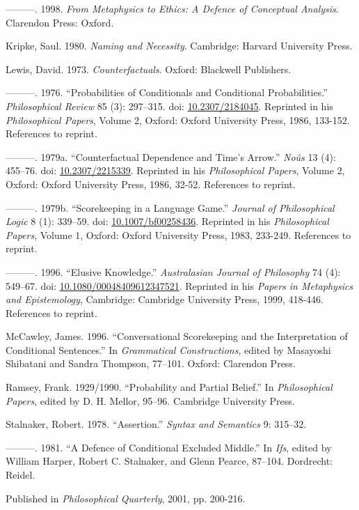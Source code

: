 \documentclass[
  10pt,
  letterpaper,
  DIV=11,
  numbers=noendperiod,
  twoside]{scrartcl}
\newlength{\cslhangindent}
\newenvironment{CSLReferences}[2] %
 {\begin{list}{}{%
  \setlength{\itemindent}{0pt}
  \setlength{\leftmargin}{0pt}
  \setlength{\parsep}{0pt}
  \ifodd #1
   \setlength{\leftmargin}{\cslhangindent}
   \setlength{\itemindent}{-1\cslhangindent}
  \fi
  \setlength{\itemsep}{#2\baselineskip}}}
 {\end{list}}
\begin{document}
\begin{CSLReferences}{1}{0}
---------. 1998. \emph{From Metaphysics to Ethics: A Defence of
Conceptual Analysis}. Clarendon Press: Oxford.

Kripke, Saul. 1980. \emph{Naming and Necessity}. Cambridge: Harvard
University Press.

Lewis, David. 1973. \emph{Counterfactuals}. Oxford: Blackwell
Publishers.

---------. 1976. {``Probabilities of Conditionals and Conditional
Probabilities.''} \emph{Philosophical Review} 85 (3): 297--315. doi:
\href{https://doi.org/10.2307/2184045}{10.2307/2184045}. Reprinted in
his \emph{Philosophical Papers}, Volume 2, Oxford: Oxford University
Press, 1986, 133-152. References to reprint.

---------. 1979a. {``Counterfactual Dependence and Time's Arrow.''}
\emph{No{û}s} 13 (4): 455--76. doi:
\href{https://doi.org/10.2307/2215339}{10.2307/2215339}. Reprinted in
his \emph{Philosophical Papers}, Volume 2, Oxford: Oxford University
Press, 1986, 32-52. References to reprint.

---------. 1979b. {``Scorekeeping in a Language Game.''} \emph{Journal
of Philosophical Logic} 8 (1): 339--59. doi:
\href{https://doi.org/10.1007/bf00258436}{10.1007/bf00258436}. Reprinted
in his \emph{Philosophical Papers}, Volume 1, Oxford: Oxford University
Press, 1983, 233-249. References to reprint.

---------. 1996. {``Elusive Knowledge.''} \emph{Australasian Journal of
Philosophy} 74 (4): 549--67. doi:
\href{https://doi.org/10.1080/00048409612347521}{10.1080/00048409612347521}.
Reprinted in his \emph{Papers in Metaphysics and Epistemology},
Cambridge: Cambridge University Press, 1999, 418-446. References to
reprint.

McCawley, James. 1996. {``Conversational Scorekeeping and the
Interpretation of Conditional Sentences.''} In \emph{Grammatical
Constructions}, edited by Masayoshi Shibatani and Sandra Thompson,
77--101. Oxford: Clarendon Press.

Ramsey, Frank. 1929/1990. {``Probability and Partial Belief.''} In
\emph{Philosophical Papers}, edited by D. H. Mellor, 95--96. Cambridge
University Press.

Stalnaker, Robert. 1978. {``Assertion.''} \emph{Syntax and Semantics} 9:
315--32.

---------. 1981. {``A Defence of Conditional Excluded Middle.''} In
\emph{Ifs}, edited by William Harper, Robert C. Stalnaker, and Glenn
Pearce, 87--104. Dordrecht: Reidel.

\end{CSLReferences}



\noindent Published in\emph{
Philosophical Quarterly}, 2001, pp. 200-216.
\end{document}
